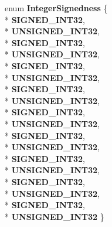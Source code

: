 \begin{DoxyCompactItemize}
\item 
enum {\bfseries Integer\+Signedness} \{ \\*
{\bfseries S\+I\+G\+N\+E\+D\+\_\+\+I\+N\+T32}, 
\\*
{\bfseries U\+N\+S\+I\+G\+N\+E\+D\+\_\+\+I\+N\+T32}, 
\\*
{\bfseries S\+I\+G\+N\+E\+D\+\_\+\+I\+N\+T32}, 
\\*
{\bfseries U\+N\+S\+I\+G\+N\+E\+D\+\_\+\+I\+N\+T32}, 
\\*
{\bfseries S\+I\+G\+N\+E\+D\+\_\+\+I\+N\+T32}, 
\\*
{\bfseries U\+N\+S\+I\+G\+N\+E\+D\+\_\+\+I\+N\+T32}, 
\\*
{\bfseries S\+I\+G\+N\+E\+D\+\_\+\+I\+N\+T32}, 
\\*
{\bfseries U\+N\+S\+I\+G\+N\+E\+D\+\_\+\+I\+N\+T32}, 
\\*
{\bfseries S\+I\+G\+N\+E\+D\+\_\+\+I\+N\+T32}, 
\\*
{\bfseries U\+N\+S\+I\+G\+N\+E\+D\+\_\+\+I\+N\+T32}, 
\\*
{\bfseries S\+I\+G\+N\+E\+D\+\_\+\+I\+N\+T32}, 
\\*
{\bfseries U\+N\+S\+I\+G\+N\+E\+D\+\_\+\+I\+N\+T32}, 
\\*
{\bfseries S\+I\+G\+N\+E\+D\+\_\+\+I\+N\+T32}, 
\\*
{\bfseries U\+N\+S\+I\+G\+N\+E\+D\+\_\+\+I\+N\+T32}, 
\\*
{\bfseries S\+I\+G\+N\+E\+D\+\_\+\+I\+N\+T32}, 
\\*
{\bfseries U\+N\+S\+I\+G\+N\+E\+D\+\_\+\+I\+N\+T32}, 
\\*
{\bfseries S\+I\+G\+N\+E\+D\+\_\+\+I\+N\+T32}, 
\\*
{\bfseries U\+N\+S\+I\+G\+N\+E\+D\+\_\+\+I\+N\+T32}
 \}\hypertarget{classv8_1_1internal_1_1_l_code_gen_a29a982d57fb7548092bffc62539543b6}{}\label{classv8_1_1internal_1_1_l_code_gen_a29a982d57fb7548092bffc62539543b6}


\end{DoxyCompactItemize}
